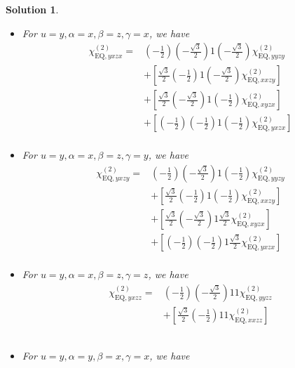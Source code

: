 \documentclass[UTF8,10pt,a4paper]{article}
\theoremstyle{Problem}
\theoremstyle{Solution}
\newtheorem*{sol}{Solution}
\begin{document}
\begin{sol}
\begin{itemize}
\item For $u=y,\alpha=x,\beta=z,\gamma=x$, we have
\footnotesize\begin{align}
\nonumber\chi_{\text{EQ},yxzx}^{(2)}=&\left(-\frac{1}{2}\right)\left(-\frac{\sqrt{3}}{2}\right)1\left(-\frac{\sqrt{3}}{2}\right)\chi_{\text{EQ},yyzy}^{(2)}\\
\nonumber&+\left[\frac{\sqrt{3}}{2}\left(-\frac{1}{2}\right)1\left(-\frac{\sqrt{3}}{2}\right)\chi_{\text{EQ},xxzy}^{(2)}\right]\\
\nonumber&+\left[\frac{\sqrt{3}}{2}\left(-\frac{\sqrt{3}}{2}\right)1\left(-\frac{1}{2}\right)\chi_{\text{EQ},xyzx}^{(2)}\right]\\
\nonumber&+\left[\left(-\frac{1}{2}\right)\left(-\frac{1}{2}\right)1\left(-\frac{1}{2}\right)\chi_{\text{EQ},yxzx}^{(2)}\right]\\
&
\end{align}\normalsize
\item For $u=y,\alpha=x,\beta=z,\gamma=y$, we have
\footnotesize\begin{align}
\nonumber\chi_{\text{EQ},yxzy}^{(2)}=&\left(-\frac{1}{2}\right)\left(-\frac{\sqrt{3}}{2}\right)1\left(-\frac{1}{2}\right)\chi_{\text{EQ},yyzy}^{(2)}\\
\nonumber&+\left[\frac{\sqrt{3}}{2}\left(-\frac{1}{2}\right)1\left(-\frac{1}{2}\right)\chi_{\text{EQ},xxzy}^{(2)}\right]\\
\nonumber&+\left[\frac{\sqrt{3}}{2}\left(-\frac{\sqrt{3}}{2}\right)1\frac{\sqrt{3}}{2}\chi_{\text{EQ},xyzx}^{(2)}\right]\\
\nonumber&+\left[\left(-\frac{1}{2}\right)\left(-\frac{1}{2}\right)1\frac{\sqrt{3}}{2}\chi_{\text{EQ},yxzx}^{(2)}\right]\\
&
\end{align}\normalsize
\item For $u=y,\alpha=x,\beta=z,\gamma=z$, we have
\footnotesize\begin{align}
\nonumber\chi_{\text{EQ},yxzz}^{(2)}=&\left(-\frac{1}{2}\right)\left(-\frac{\sqrt{3}}{2}\right)11\chi_{\text{EQ},yyzz}^{(2)}\\
\nonumber&+\left[\frac{\sqrt{3}}{2}\left(-\frac{1}{2}\right)11\chi_{\text{EQ},xxzz}^{(2)}\right]\\
\nonumber&\\
\nonumber&\\
&
\end{align}\normalsize
\item For $u=y,\alpha=y,\beta=x,\gamma=x$, we have
\footnotesize\begin{align}

\end{align}
\end{itemize}
\end{sol}
\end{document}
